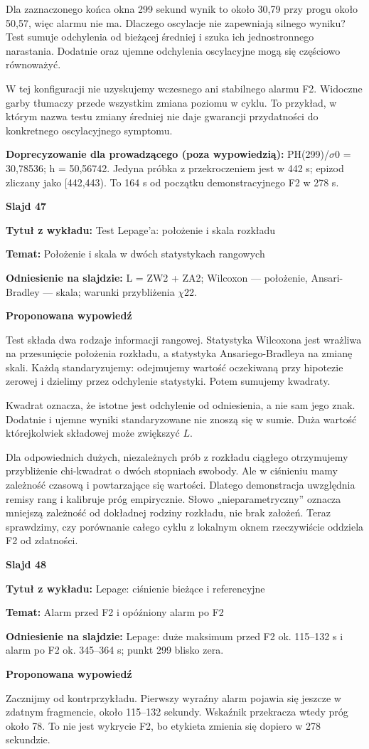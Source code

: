 \documentclass[a4paper,11pt]{article}
\newcommand{\NumerSlajdu}{1}
\newcommand{\Komentarz}[3]{%
  \gdef\NumerSlajdu{#1}%
  {\Large\bfseries Slajd #1\par}\smallskip
  \textbf{Tytuł z wykładu:} #2\par
  \textbf{Temat:} #3\par\medskip
}
\begin{document}
Dla zaznaczonego końca okna 299 sekund wynik to około 30,79 przy progu około 50,57, więc alarmu nie ma. Dlaczego oscylacje nie zapewniają silnego wyniku? Test sumuje odchylenia od bieżącej średniej i szuka ich jednostronnego narastania. Dodatnie oraz ujemne odchylenia oscylacyjne mogą się częściowo równoważyć.

W tej konfiguracji nie uzyskujemy wczesnego ani stabilnego alarmu F2. Widoczne garby tłumaczy przede wszystkim zmiana poziomu w cyklu. To przykład, w którym nazwa testu zmiany średniej nie daje gwarancji przydatności do konkretnego oscylacyjnego symptomu.

{\small\color{black!65}\textbf{Doprecyzowanie dla prowadzącego (poza wypowiedzią):} PH(299)/\ensuremath{\sigma}0 = 30,78536; h = 50,56742. Jedyna próbka z przekroczeniem jest w 442 s; epizod zliczany jako [442,443). To 164 s od początku demonstracyjnego F2 w 278 s.\par}
\clearpage

\Komentarz{47}{Test Lepage’a: położenie i skala rozkładu}{Położenie i skala w dwóch statystykach rangowych}
{\small\color{black!65}\textbf{Odniesienie na slajdzie:} L = ZW2 + ZA2; Wilcoxon — położenie, Ansari-Bradley — skala; warunki przybliżenia \ensuremath{\chi}22.\par}
\medskip
\textbf{Proponowana wypowiedź}\par
Test składa dwa rodzaje informacji rangowej. Statystyka Wilcoxona jest wrażliwa na przesunięcie położenia rozkładu, a statystyka Ansariego-Bradleya na zmianę skali. Każdą standaryzujemy: odejmujemy wartość oczekiwaną przy hipotezie zerowej i dzielimy przez odchylenie statystyki. Potem sumujemy kwadraty.

Kwadrat oznacza, że istotne jest odchylenie od odniesienia, a nie sam jego znak. Dodatnie i ujemne wyniki standaryzowane nie znoszą się w sumie. Duża wartość którejkolwiek składowej może zwiększyć $L$.

Dla odpowiednich dużych, niezależnych prób z rozkładu ciągłego otrzymujemy przybliżenie chi-kwadrat o dwóch stopniach swobody. Ale w ciśnieniu mamy zależność czasową i powtarzające się wartości. Dlatego demonstracja uwzględnia remisy rang i kalibruje próg empirycznie. Słowo „nieparametryczny” oznacza mniejszą zależność od dokładnej rodziny rozkładu, nie brak założeń. Teraz sprawdzimy, czy porównanie całego cyklu z lokalnym oknem rzeczywiście oddziela F2 od zdatności.
\clearpage

\Komentarz{48}{Lepage: ciśnienie bieżące i referencyjne}{Alarm przed F2 i opóźniony alarm po F2}
{\small\color{black!65}\textbf{Odniesienie na slajdzie:} Lepage: duże maksimum przed F2 ok. 115–132 s i alarm po F2 ok. 345–364 s; punkt 299 blisko zera.\par}
\medskip
\textbf{Proponowana wypowiedź}\par
Zacznijmy od kontrprzykładu. Pierwszy wyraźny alarm pojawia się jeszcze w zdatnym fragmencie, około 115–132 sekundy. Wskaźnik przekracza wtedy próg około 78. To nie jest wykrycie F2, bo etykieta zmienia się dopiero w 278 sekundzie.
\end{document}
